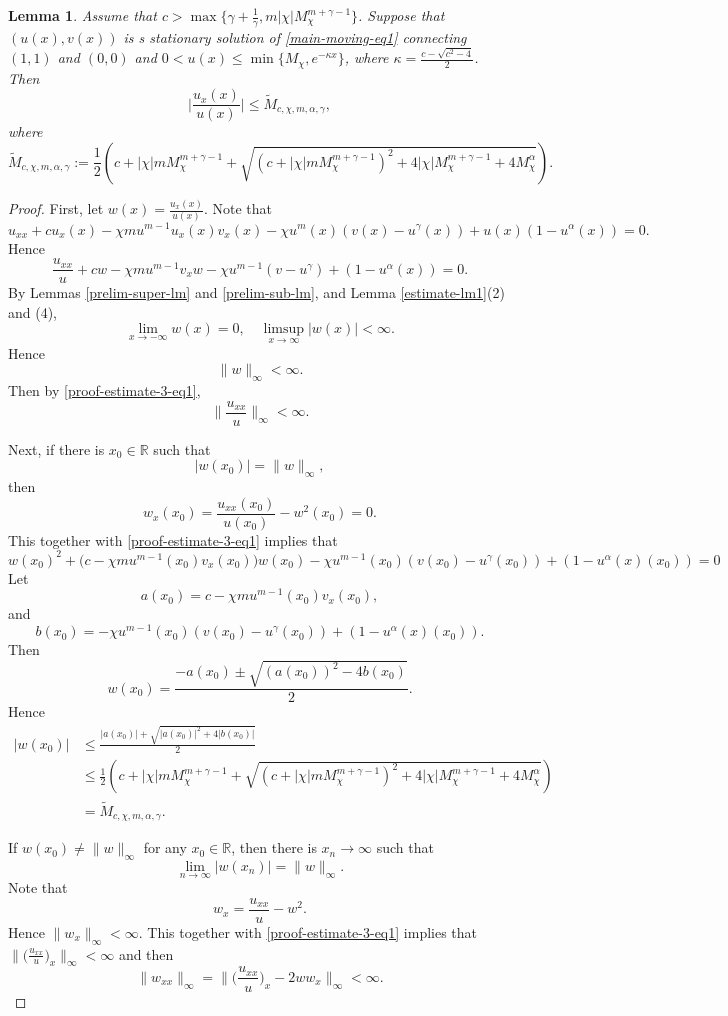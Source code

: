 \documentclass[10pt,a4paper]{amsart}
\newtheorem{lemma}{Lemma}
\newcommand\RR{\ensuremath{\mathbb{R}}}
\begin{document}
\begin{lemma}
\label{estimate-lm2}Assume that $c>\max\big\{\gamma+\frac{1}{\gamma}, m|\chi| M^{m+\gamma-1}_\chi\big\}$.   Suppose that  $(u(x),v(x))$ is  s stationary  solution of \eqref{main-moving-eq1}  connecting $(1,1)$ and $(0,0)$  and $0<u(x)\le \min\{M_\chi, e^{-\kappa x}\}$, where $\kappa=\frac{c-\sqrt{c^2-4}}{2}$.
Then
$$
\big|\frac{u_x(x)}{u(x)}\big|\le  \widetilde M_{c,\chi,m,\alpha,\gamma},
$$
where
$$
\widetilde M_{c,\chi,m,\alpha,\gamma}:= \frac{1}{2}\left( c+|\chi| m M_{\chi}^{m+\gamma-1}+\sqrt{ (c+|\chi| m M_{\chi}^{m+\gamma-1})^2 +4|\chi| M_{\chi}^{m+\gamma-1}+4M_{\chi}^\alpha}\right).
$$
\end{lemma}

\begin{proof}
First, let $w(x)=\frac{u_x(x)}{u(x)}$.
Note that
$$
u_{xx}+c u_x(x)-\chi m u^{m-1} u_x(x) v_x(x)-\chi u^m(x) (v(x)-u^\gamma (x))+u(x) (1-u^\alpha(x))=0.
$$
Hence
\begin{equation}
\label{proof-estimate-3-eq1}
\frac{u_{xx}}{u}+c w -\chi m u^{m-1} v_x w -\chi u^{m-1} (v-u^\gamma)+(1-u^\alpha(x))=0.
\end{equation}
By Lemmas \ref{prelim-super-lm} and \ref{prelim-sub-lm}, and   Lemma \ref{estimate-lm1}(2) and (4), 
$$
\lim_{x\to -\infty} w(x)=0,\quad \limsup_{x\to\infty}|w(x)|<\infty.
$$
Hence 
$$
\|w\|_\infty<\infty.
$$
Then by \eqref{proof-estimate-3-eq1},
$$
\|\frac{u_{xx}}{u}\|_\infty<\infty.
$$

Next, if there is $x_0\in\RR$ such that
$$
|w(x_0)|=\|w\|_\infty,
$$
then
$$
w_x(x_0)=\frac{u_{xx}(x_0)}{u(x_0)}-w^2 (x_0)=0.
$$
This together with \eqref{proof-estimate-3-eq1} implies that
$$
w(x_0)^2+\Big(c-\chi m u^{m-1}(x_0)v_x(x_0)\big) w(x_0) -\chi u^{m-1}(x_0) (v(x_0)-u^\gamma(x_0))+(1-u^\alpha(x)(x_0))=0
$$
Let 
$$a(x_0)=c-\chi m u^{m-1}(x_0)v_x(x_0),
$$
and
$$
b(x_0)=-\chi u^{m-1}(x_0) (v(x_0)-u^\gamma(x_0))+(1-u^\alpha(x)(x_0)).
$$
Then 
$$
w(x_0)= \frac{-a(x_0)\pm \sqrt{(a(x_0))^2- 4 b(x_0)}}{2}.
$$
Hence
\begin{align*}
|w(x_0)|&\le\frac{|a(x_0)| +\sqrt{|a(x_0)|^2+4|b(x_0)|}}{2}\\
&\le \frac{1}{2}\left( c+|\chi| m M_{\chi}^{m+\gamma-1}+\sqrt{ (c+|\chi| m M_{\chi}^{m+\gamma-1})^2 +4|\chi| M_{\chi}^{m+\gamma-1}+4M_{\chi}^\alpha}\right)\\
&=\widetilde M_{c,\chi,m,\alpha,\gamma}.
\end{align*}



If $w(x_0)\not = \|w\|_\infty$ for any $x_0\in\RR$, then there is $x_n\to\infty$ such that
$$
\lim_{n\to\infty} |w(x_n)|=\|w\|_\infty.
$$
Note that
$$
w_x=\frac{u_{xx}}{u}-w^2.
$$
Hence $\|w_x\|_\infty<\infty$. This together with \eqref{proof-estimate-3-eq1} implies that
$\|\big(\frac{u_{xx}}{u}\big)_x\|_\infty<\infty$ and then
$$
\|w_{xx}\|_\infty=\|\big(\frac{u_{xx}}{u}\big)_x-2w w_x\|_\infty<\infty.
$$



\end{proof}
\end{document}
